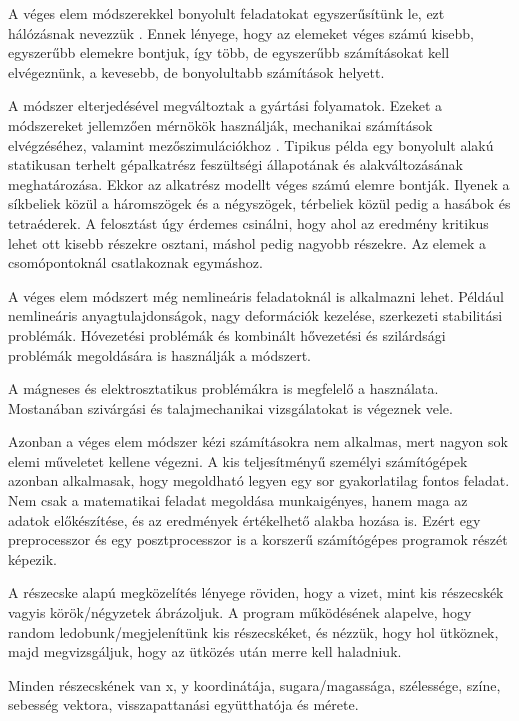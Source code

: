 A véges elem módszerekkel
bonyolult feladatokat egyszerűsítünk le, ezt hálózásnak nevezzük \cite{veges1}. Ennek lényege, hogy az elemeket véges számú kisebb, egyszerűbb elemekre bontjuk, így több, de egyszerűbb számításokat kell elvégeznünk, a kevesebb, de bonyolultabb számítások helyett.

A módszer elterjedésével megváltoztak a gyártási folyamatok. Ezeket a módszereket jellemzően mérnökök használják, mechanikai számítások elvégzéséhez, valamint mezőszimulációkhoz \cite{wiki}. Tipikus példa egy bonyolult alakú statikusan terhelt gépalkatrész feszültségi állapotának és alakváltozásának meghatározása. Ekkor az alkatrész modellt véges számú elemre bontják. Ilyenek a síkbeliek közül a háromszögek és a négyszögek, térbeliek közül pedig a hasábok és tetraéderek. A felosztást úgy érdemes csinálni, hogy ahol az eredmény kritikus lehet ott kisebb részekre osztani, máshol pedig nagyobb részekre. Az elemek a csomópontoknál csatlakoznak egymáshoz. 

A véges elem módszert még nemlineáris feladatoknál is alkalmazni lehet. Például nemlineáris anyagtulajdonságok, nagy deformációk kezelése, szerkezeti stabilitási problémák. Hóvezetési problémák és kombinált hővezetési és szilárdsági problémák megoldására is használják a módszert. 

A mágneses és elektrosztatikus problémákra is megfelelő a használata. Mostanában szivárgási és talajmechanikai vizsgálatokat is végeznek vele. 

Azonban a véges elem módszer kézi számításokra nem alkalmas, mert nagyon sok elemi műveletet kellene végezni. A kis teljesítményű személyi számítógépek azonban alkalmasak, hogy megoldható legyen egy sor gyakorlatilag fontos feladat. Nem csak a matematikai feladat megoldása munkaigényes, hanem maga az adatok előkészítése, és az eredmények értékelhető alakba hozása is. Ezért egy preprocesszor és egy posztprocesszor is a korszerű számítógépes programok részét képezik.   






A részecske alapú megközelítés lényege röviden, hogy a vizet, mint kis részecskék vagyis körök/négyzetek ábrázoljuk. A program működésének alapelve, hogy random ledobunk/megjelenítünk kis részecskéket, és nézzük, hogy hol ütköznek, majd megvizsgáljuk, hogy az ütközés után merre kell haladniuk. 

Minden részecskének van x, y koordinátája, sugara/magassága, szélessége, színe, sebesség vektora, visszapattanási együtthatója és mérete. 


